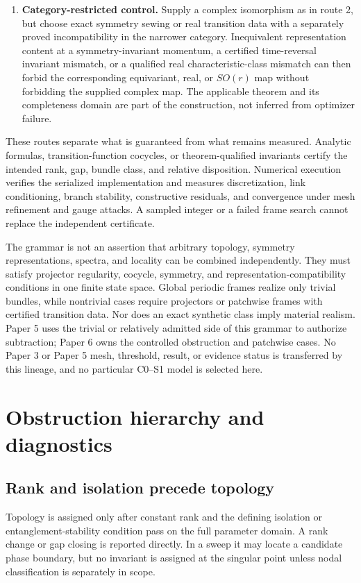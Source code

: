 \documentclass[11pt]{article}
\newenvironment{prospective}{\color{prospectivered}}{}
\begin{document}
\begin{prospective}
\begin{enumerate}
 \item \textbf{Category-restricted control.} Supply a complex isomorphism as in route 2,
 but choose exact symmetry sewing or real transition data with a separately proved
 incompatibility in the narrower category. Inequivalent representation content at a
 symmetry-invariant momentum, a certified time-reversal invariant mismatch, or a
 qualified real characteristic-class mismatch can then forbid the corresponding
 equivariant, real, or $SO(r)$ map without forbidding the supplied complex map. The
 applicable theorem and its completeness domain are part of the construction, not
 inferred from optimizer failure.
\end{enumerate}

These routes separate what is guaranteed from what remains measured. Analytic formulas,
transition-function cocycles, or theorem-qualified invariants certify the intended rank,
gap, bundle class, and relative disposition. Numerical execution verifies the serialized
implementation and measures discretization, link conditioning, branch stability,
constructive residuals, and convergence under mesh refinement and gauge attacks. A
sampled integer or a failed frame search cannot replace the independent certificate.

The grammar is not an assertion that arbitrary topology, symmetry representations,
spectra, and locality can be combined independently. They must satisfy projector
regularity, cocycle, symmetry, and representation-compatibility conditions in one finite
state space. Global periodic frames realize only trivial bundles, while nontrivial cases
require projectors or patchwise frames with certified transition data. Nor does an exact
synthetic class imply material realism. Paper 5 uses the trivial or relatively admitted
side of this grammar to authorize subtraction; Paper 6 owns the controlled obstruction
and patchwise cases. No Paper 3 or Paper 5 mesh, threshold, result, or evidence status is
transferred by this lineage, and no particular C0--S1 model is selected here.

\section{Obstruction hierarchy and diagnostics}

\subsection{Rank and isolation precede topology}
Topology is assigned only after constant rank and the defining isolation or
entanglement-stability condition pass on the full parameter domain. A rank change or gap
closing is reported directly. In a sweep it may locate a candidate phase boundary, but
no invariant is assigned at the singular point unless nodal classification is separately
in scope.


\end{prospective}
\end{document}
